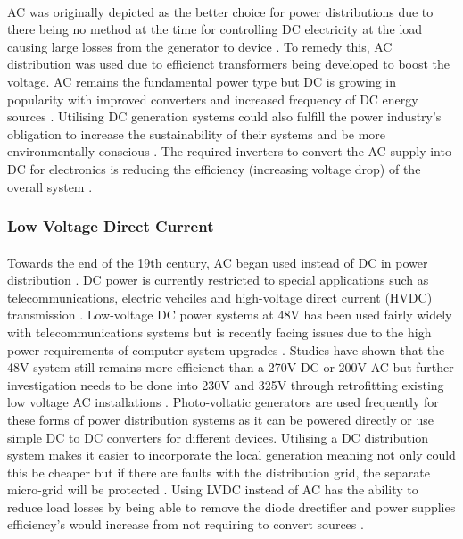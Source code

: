 \paragraph{}
AC was originally depicted as the better choice for power distributions due to there being no method at the time for controlling DC electricity at the load causing large losses from the generator to device \cite{Starke2008b}. To remedy this, AC distribution was used due to efficienct transformers being developed to boost the voltage. AC remains the fundamental power type but DC is growing in popularity with improved converters and increased frequency of DC energy sources \cite{Starke2008b}. Utilising DC generation systems could also fulfill the power industry's obligation to increase the sustainability of their systems and be more environmentally conscious \cite{Starke2008a}. The required inverters to convert the AC supply into DC for electronics is reducing the efficiency (increasing voltage drop) of the overall system \cite{Starke2008b}.       

\subsubsection{Low Voltage Direct Current}

\paragraph{}
Towards the end of the 19th century, AC began used instead of DC in power distribution \cite{Salomonsson2007}. DC power is currently restricted to special applications such as telecommunications, electric vehciles and high-voltage direct current (HVDC) transmission \cite{Salomonsson2007}. Low-voltage DC power systems at 48V has been used fairly widely with telecommunications systems but is recently facing issues due to the high power requirements of computer system upgrades \cite{Salomonsson2007}. Studies have shown that the 48V system still remains more efficienct than a 270V DC or 200V AC but further investigation needs to be done into 230V and 325V through retrofitting existing low voltage AC installations \cite{Salomonsson2007}. Photo-voltatic generators are used frequently for these forms of power distribution systems as it can be powered directly or use simple DC to DC converters for different devices. Utilising a DC distribution system makes it easier to incorporate the local generation meaning not only could this be cheaper but if there are faults with the distribution grid, the separate micro-grid will be protected \cite{Starke2008a}. Using LVDC instead of AC has the ability to reduce load losses by being able to remove the diode drectifier and power supplies efficiency's would increase from not requiring to convert sources \cite{Salomonsson2007}. 

